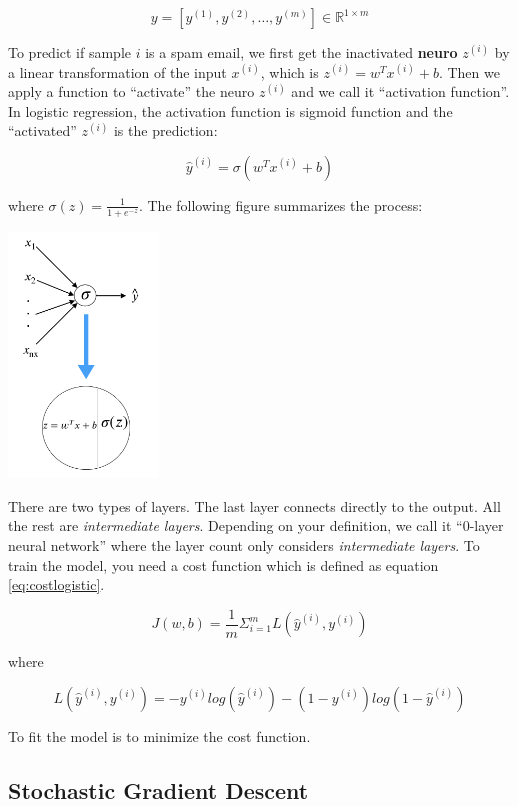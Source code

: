 \documentclass[
  12pt,
]{krantz}
\begin{document}
\[y=[y^{(1)},y^{(2)},\dots,y^{(m)}] \in \mathbb{R}^{1 \times m}\]

To predict if sample \(i\) is a spam email, we first get the inactivated \textbf{neuro} \(z^{(i)}\) by a linear transformation of the input \(x^{(i)}\), which is \(z^{(i)}=w^Tx^{(i)} + b\). Then we apply a function to ``activate'' the neuro \(z^{(i)}\) and we call it ``activation function''. In logistic regression, the activation function is sigmoid function and the ``activated'' \(z^{(i)}\) is the prediction:

\[\hat{y}^{(i)} = \sigma(w^Tx^{(i)} + b)\]

where \(\sigma(z) = \frac{1}{1+e^{-z}}\). The following figure summarizes the process:

\includegraphics[width=0.3\textwidth,height=\textheight]{images/dnn0.png}

There are two types of layers. The last layer connects directly to the output. All the rest are \emph{intermediate layers}. Depending on your definition, we call it ``0-layer neural network'' where the layer count only considers \emph{intermediate layers}. To train the model, you need a cost function which is defined as equation \eqref{eq:costlogistic}.

\begin{equation}
J(w,b)=\frac{1}{m} \Sigma_{i=1}^m L(\hat{y}^{(i)}, y^{(i)})
\label{eq:costlogistic}
\end{equation}

where

\[L(\hat{y}^{(i)}, y^{(i)}) =  -y^{(i)}log(\hat{y}^{(i)})-(1-y^{(i)})log(1-\hat{y}^{(i)})\]

To fit the model is to minimize the cost function.

\hypertarget{stochastic-gradient-descent}{%
\subsection{Stochastic Gradient Descent}\label{stochastic-gradient-descent}}
\end{document}
